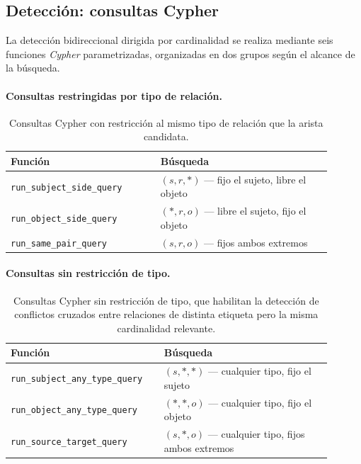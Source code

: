 \subsection{Detección: consultas Cypher}

La detección bidireccional dirigida por cardinalidad se realiza mediante seis funciones \emph{Cypher} parametrizadas, organizadas en dos grupos según el alcance de la búsqueda.

\paragraph{Consultas restringidas por tipo de relación.}

\begin{table}[H]
\centering
\small
\begin{tabular}{p{0.42\linewidth}p{0.48\linewidth}}
\hline
\textbf{Función} & \textbf{Búsqueda} \\ \hline
\texttt{run\_subject\_side\_query} & $(s, r, *)$ --- fijo el sujeto, libre el objeto \\
\texttt{run\_object\_side\_query} & $(*, r, o)$ --- libre el sujeto, fijo el objeto \\
\texttt{run\_same\_pair\_query} & $(s, r, o)$ --- fijos ambos extremos \\ \hline
\end{tabular}
\caption{Consultas Cypher con restricción al mismo tipo de relación que la arista candidata.}
\label{tab:impl-etcdr-q-typed}
\end{table}

\paragraph{Consultas sin restricción de tipo.}

\begin{table}[H]
\centering
\small
\begin{tabular}{p{0.42\linewidth}p{0.48\linewidth}}
\hline
\textbf{Función} & \textbf{Búsqueda} \\ \hline
\texttt{run\_subject\_any\_type\_query} & $(s, *, *)$ --- cualquier tipo, fijo el sujeto \\
\texttt{run\_object\_any\_type\_query} & $(*, *, o)$ --- cualquier tipo, fijo el objeto \\
\texttt{run\_source\_target\_query} & $(s, *, o)$ --- cualquier tipo, fijos ambos extremos \\ \hline
\end{tabular}
\caption{Consultas Cypher sin restricción de tipo, que habilitan la detección de conflictos cruzados entre relaciones de distinta etiqueta pero la misma cardinalidad relevante.}
\label{tab:impl-etcdr-q-anytype}
\end{table}

